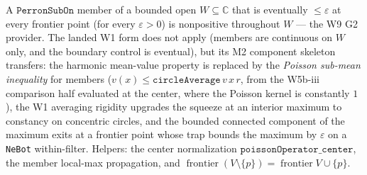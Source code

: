 \begin{lemma}
\label{lem:perron-sub-on-max-principle}
A \(\texttt{PerronSubOn}\) member of a bounded open \(W \subseteq \mathbb{C}\)
that is eventually \(\le \varepsilon\) at every frontier point (for
every \(\varepsilon > 0\)) is nonpositive throughout \(W\) — the W9 G2
provider.  The landed W1 form does not apply (members are continuous on
\(W\) only, and the boundary control is eventual), but its M2 component
skeleton transfers: the harmonic mean-value property is replaced by the
\emph{Poisson sub-mean inequality} for members
(\(v(x) \le \texttt{circleAverage}\,v\,x\,r\), from the W5b-iii
comparison half evaluated at the center, where the Poisson kernel is
constantly \(1\)), the W1 averaging rigidity upgrades the squeeze at an
interior maximum to constancy on concentric circles, and the bounded
connected component of the maximum exits at a frontier point whose trap
bounds the maximum by \(\varepsilon\) on a \texttt{NeBot}
within-filter.  Helpers: the center normalization
\(\texttt{poissonOperator\_center}\), the member local-max propagation,
and \(\operatorname{frontier}(V \setminus \{p\}) =
\operatorname{frontier} V \cup \{p\}\).
\leanok
\end{lemma}

